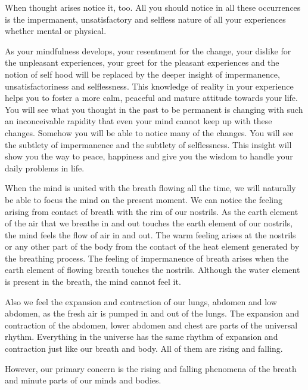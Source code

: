When thought arises notice it, too. All you should notice in all these
occurrences is the impermanent, unsatisfactory and selfless nature of all your
experiences whether mental or physical.

As your mindfulness develops, your resentment for the change, your dislike for
the unpleasant experiences, your greet for the pleasant experiences and the
notion of self hood will be replaced by the deeper insight of impermanence,
unsatisfactoriness and selflessness. This knowledge of reality in your
experience helps you to foster a more calm, peaceful and mature attitude towards
your life. You will see what you thought in the past to be permanent is changing
with such an inconceivable rapidity that even your mind cannot keep up with
these changes. Somehow you will be able to notice many of the changes. You will
see the subtlety of impermanence and the subtlety of selflessness. This insight
will show you the way to peace, happiness and give you the wisdom to handle your
daily problems in life.

When the mind is united with the breath flowing all the time, we will naturally
be able to focus the mind on the present moment.
We can notice the feeling arising from contact of breath with the rim of our nostrils. As the earth element of the air that we breathe
in and out touches the earth element of our nostrils, the mind feels the flow of air in and out. The warm feeling arises at the
nostrils or any other part of the body from the contact of the heat element generated by the breathing process. The feeling of
impermanence of breath arises when the earth element of flowing breath touches the nostrils. Although the water element is present
in the breath, the mind cannot feel it.

Also we feel the expansion and contraction of our lungs, abdomen and low
abdomen, as the fresh air is pumped in and out of the lungs. The expansion and
contraction of the abdomen, lower abdomen and chest are parts of the universal
rhythm. Everything in the universe has the same rhythm of expansion and
contraction just like our breath and body. All of them are rising and falling.

However, our primary concern is the rising and falling phenomena of the breath
and minute parts of our minds and bodies.

